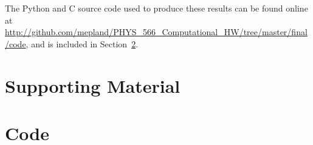 \documentclass[notitlepage,aps,prd,nofootinbib]{revtex4-1}
\begin{document}
The Python and C source code used to produce these results can be found online at \url{http://github.com/mepland/PHYS_566_Computational_HW/tree/master/final/code}, and is included in Section~\ref{sec:code}.


\clearpage
\section{Supporting Material}
\label{sec:Supporting_Material}





\clearpage


\clearpage
\section{Code}
\label{sec:code}




\end{document}
